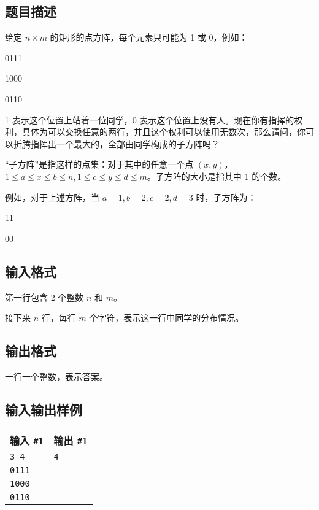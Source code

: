 \documentclass{article}
\begin{document}
	\subsection{题目描述}

	给定 $n\times m$ 的矩形的点方阵，每个元素只可能为 1 或 0，例如：

	\begin{center}
		0111

		1000

		0110
	\end{center}
	
	1 表示这个位置上站着一位同学，0 表示这个位置上没有人。现在你有指挥的权利，具体为可以交换任意的两行，并且这个权利可以使用无数次，那么请问，你可以折腾指挥出一个最大的，全部由同学构成的子方阵吗？
	
	“子方阵”是指这样的点集：对于其中的任意一个点 $(x,y)$，$1\le a\le x\le b\le n,1\le c\le y\le d\le m$。子方阵的大小是指其中 1 的个数。

	例如，对于上述方阵，当 $a=1,b=2,c=2,d=3$ 时，子方阵为：

	\begin{center}
		11

		00
	\end{center}


	\subsection{输入格式}

	第一行包含 2 个整数 $n$ 和 $m$。

	接下来 $n$ 行，每行 $m$ 个字符，表示这一行中同学的分布情况。

	\subsection{输出格式}

	一行一个整数，表示答案。

	\subsection{输入输出样例}

	\begin{tabularx}{\textwidth}{|X|X|}
		\hline
		\textbf{输入 \texttt{\#}1} & \textbf{输出 \texttt{\#}1} \\
		\hline
		\texttt{3 4} & \texttt{4}\\
		\texttt{0111} & \\
		\texttt{1000} & \\
		\texttt{0110} & \\
		\hline
	\end{tabularx}
\end{document}
